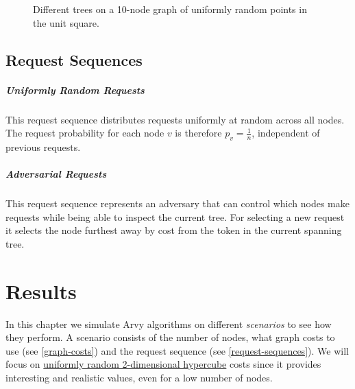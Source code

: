 \documentclass[a4paper, oneside]{discothesis}
\begin{document}
\begin{figure}
\caption{Different trees on a 10-node graph of uniformly random points in the unit square. }
\label{tree-examples}
\end{figure}

\section{Request Sequences}
\label{request-sequences}

\paragraph{Uniformly Random Requests}\label{req:random} This request sequence distributes requests uniformly at random across all nodes. The request probability for each node $v$ is therefore $p_v=\frac{1}{n}$, independent of previous requests.

\paragraph{Adversarial Requests}\label{req:adversary} This request sequence represents an adversary that can control which nodes make requests while being able to inspect the current tree. For selecting a new request it selects the node furthest away by cost from the token in the current spanning tree.

\chapter{Results}

In this chapter we simulate Arvy algorithms on different \textit{scenarios} to see how they perform. A scenario consists of the number of nodes, what graph costs to use (see \autoref{graph-costs}) and the request sequence (see \autoref{request-sequences}). We will focus on \hyperref[costs:cube]{uniformly random 2-dimensional hypercube} costs since it provides interesting and realistic values, even for a low number of nodes.
\end{document}
